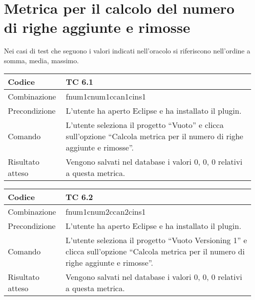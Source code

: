 \clearpage

\section{Metrica per il calcolo del numero di righe aggiunte e rimosse}
Nei casi di test che seguono i valori indicati nell'oracolo si riferiscono nell'ordine a somma, media, massimo.\\

\begin{table}[ht]
\begin{tabular}{|p{3cm}|p{9cm}|}
\hline
\cellcolor{lightgray}Codice				& TC 6.1								\\
\hline
\cellcolor{lightgray}Combinazione		& fnum1cnum1ccan1cins1									\\
\hline
\cellcolor{lightgray}Precondizione		& L'utente ha aperto Eclipse e ha installato il plugin.		\\
\hline
\cellcolor{lightgray}Comando			& L'utente seleziona il progetto ``Vuoto''  e clicca sull'opzione ``Calcola metrica per il numero di righe aggiunte e rimosse''.	\\
\hline
\cellcolor{lightgray}Risultato atteso	& Vengono salvati nel database i valori 0, 0, 0 relativi a questa metrica.\\
\hline
\end{tabular}
\end{table}

\begin{table}[ht]
\begin{tabular}{|p{3cm}|p{9cm}|}
\hline
\cellcolor{lightgray}Codice				& TC 6.2								\\
\hline
\cellcolor{lightgray}Combinazione		& fnum1cnum2ccan2cins1								\\
\hline
\cellcolor{lightgray}Precondizione		& L'utente ha aperto Eclipse e ha installato il plugin.					\\
\hline
\cellcolor{lightgray}Comando			& L'utente seleziona il progetto ``Vuoto Versioning 1''  e clicca sull'opzione ``Calcola metrica per il numero di righe aggiunte e rimosse''.	\\
\hline
\cellcolor{lightgray}Risultato atteso	& Vengono salvati nel database i valori 0, 0, 0 relativi a questa metrica.\\
\hline
\end{tabular}
\end{table}

